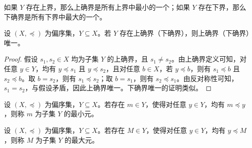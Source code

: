 \begin{note}
    如果 $Y$ 存在上界，那么上确界是所有上界中最小的一个；如果 $Y$ 存在下界，那么下确界是所有下界中最大的一个。
\end{note}

\vspace{1em}

\begin{theorem}[确界唯一性]
    设 $ (X,\preceq) $ 为偏序集，$ Y\subseteq X $。若 $ Y $ 存在上确界（下确界），则上确界（下确界）唯一。
\end{theorem}

\begin{proof}
    假设 $ s_1,s_2\in X $ 均为子集 $ Y $ 的上确界，且 $ s_1\neq s_2 $。由上确界定义可知，对任意 $ y\in Y $，均有 $ y\preceq s_1 $ 且 $ y\preceq s_2 $，且对任意 $ b\in X $，若 $ y\preceq b $，则有 $ s_1\preceq b $ 且 $ s_2\preceq b $。取 $ b=s_2 $，则有 $ s_1\preceq s_2 $；取 $ b=s_1 $，则有 $ s_2\preceq s_1 $。由反对称性可知，$ s_1=s_2 $，与假设矛盾，因此上确界唯一。下确界唯一的证明类似。
\end{proof}

\vspace{1em}

\begin{definition}
    设 $ (X,\preceq) $ 为偏序集，$ Y\subseteq X $。若存在 $ m\in Y $，使得对任意 $ y\in Y $，均有 $ m\preceq y $，则称 $ m $ 为子集 $ Y $ 的最小元。
\end{definition}

\begin{definition}
    设 $ (X,\preceq) $ 为偏序集，$ Y\subseteq X $。若存在 $ M\in Y $，使得对任意 $ y\in Y $，均有 $ y\preceq M $，则称 $ M $ 为子集 $ Y $ 的最大元。
\end{definition}



\vspace{1em}

\newpage